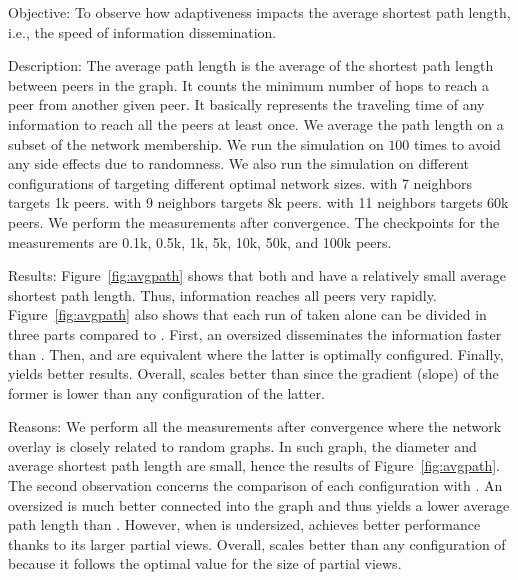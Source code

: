 \begin{asparadesc}
\item[Objective:] To observe how adaptiveness impacts the average shortest path
  length, i.e., the speed of information dissemination.
\item[Description:] The average path length is the average of the
  shortest path length between peers in the graph. It counts the
  minimum number of hops to reach a peer from another given peer. It
  basically represents the traveling time of any information to reach
  all the peers at least once. We average the path length on a subset
  of the network membership. We run the simulation on \SPRAY $100$
  times to avoid any side effects due to randomness. We also run the
  simulation on different configurations of \CYCLON targeting
  different optimal network sizes. \CYCLON with 7 neighbors targets 1k
  peers. \CYCLON with 9 neighbors targets 8k peers. \CYCLON with 11
  neighbors targets 60k peers. We perform the measurements after
  convergence. The checkpoints for the measurements are 0.1k, 0.5k,
  1k, 5k, 10k, 50k, and 100k peers.
\item[Results:] Figure~\ref{fig:avgpath} shows that both \CYCLON and
  \SPRAY have a relatively small average shortest path length. Thus,
  information reaches all peers very rapidly. Figure~\ref{fig:avgpath}
  also shows that each run of \CYCLON taken alone can be divided in
  three parts compared to \SPRAY. First, an oversized \CYCLON
  disseminates the information faster than \SPRAY. Then, \SPRAY and
  \CYCLON are equivalent where the latter is optimally
  configured. Finally, \SPRAY yields better results. Overall, \SPRAY
  scales better than \CYCLON since the gradient (slope) of the former is lower
  than any configuration of the latter.
\item[Reasons:] We perform all the measurements after convergence
  where the network overlay is closely related to random graphs. In
  such graph, the diameter and average shortest path length are small,
  hence the results of Figure~\ref{fig:avgpath}. The second
  observation concerns the comparison of each \CYCLON configuration
  with \SPRAY.  An oversized \CYCLON is much better connected into the
  graph and thus yields a lower average path length than
  \SPRAY. However, when \CYCLON is undersized, \SPRAY achieves better
  performance thanks to its larger partial views. Overall, \SPRAY
  scales better than any configuration of \CYCLON because it follows
  the optimal value for the size of partial views.
\end{asparadesc}


